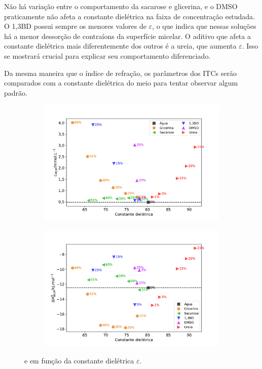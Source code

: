 		Não há variação entre o comportamento da sacarose e glicerina, e o DMSO praticamente não afeta a constante dielétrica na faixa de concentração estudada. O 1,3BD possui sempre os menores valores de \(\varepsilon\), o que indica que nessas soluções há a menor dessorção de contraíons da superfície micelar. O aditivo que afeta a constante dielétrica mais diferentemente dos outros é a ureia, que aumenta \(\varepsilon\). Isso se mostrará crucial para explicar seu comportamento diferenciado.
	
		Da mesma maneira que o índice de refração, os parâmetros dos ITCs serão comparados com a constante dielétrica do meio para tentar observar algum padrão.
		
		\begin{figure}[h]
			\begin{subfigure}[t]{0.5\textwidth}
				\centering
				\includegraphics[width=\textwidth]{imagens/itc/Cwlm_por_eps}
				\caption{\cwlm}
				\label{fig:cwlm_por_eps}
			\end{subfigure} %
			\begin{subfigure}[t]{0.5\textwidth}
				\centering
				\includegraphics[width=\textwidth]{imagens/itc/DHwlm_por_eps}
				\caption{\DHwlm}
				\label{fig:dhwlm_por_eps}
			\end{subfigure}
			
			\caption{\cwlm{} e \DHwlm{} em função da constante dielétrica \(\varepsilon\).}
			\label{fig:cwlm_dhwlm_por_eps}
		\end{figure}
		
